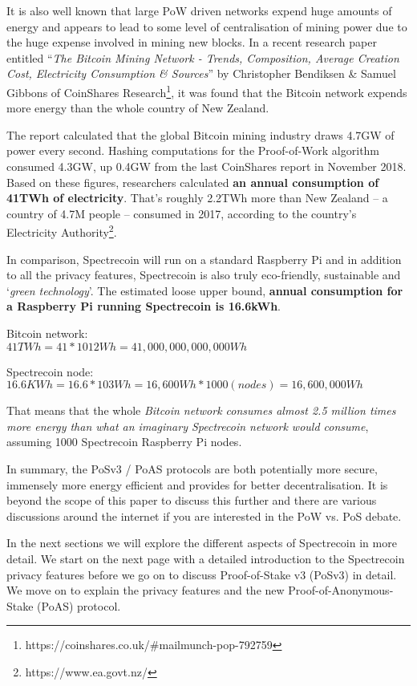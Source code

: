 It is also well known that large PoW driven networks expend huge amounts of
energy and appears to lead to some level of centralisation of mining power
due to the huge expense involved in mining new blocks. In a recent research
paper entitled “\textit{The Bitcoin Mining Network - Trends, Composition, Average
Creation Cost, Electricity Consumption \& Sources}” by Christopher Bendiksen
\& Samuel Gibbons of CoinShares 
Research\footnote{https://coinshares.co.uk/\#mailmunch-pop-792759}, 
it was found that the Bitcoin network expends more energy than the whole 
country of New Zealand.



The report calculated that the global Bitcoin mining industry draws 4.7GW of
power every second. Hashing computations for the Proof-of-Work algorithm
consumed 4.3GW, up 0.4GW from the last CoinShares report in November 2018.
Based on these figures, researchers calculated \textbf{an annual consumption of
41TWh of electricity}. That’s roughly 2.2TWh more than New Zealand – a country
of 4.7M people – consumed in 2017, according to the country’s Electricity
Authority\footnote{https://www.ea.govt.nz/}.



In comparison, Spectrecoin will run on a standard Raspberry Pi and in addition
to all the privacy features, Spectrecoin is also truly eco-friendly, sustainable
and ‘\textit{green technology}’. The estimated loose upper bound, \textbf{annual 
consumption for a Raspberry Pi running Spectrecoin is 16.6kWh}.

\vspace{5mm} %

Bitcoin network:\\
$41 TWh = 41*1012 Wh = 41,000,000,000,000 Wh$

\vspace{5mm} %

Spectrecoin node:\\
$16.6 KWh = 16.6 * 103 Wh = 16,600 Wh * 1000 (nodes) = 16,600,000 Wh$

\vspace{5mm} %

That means that the whole \textit{Bitcoin network consumes almost 2.5 million times
more energy than what an imaginary Spectrecoin network would consume}, assuming
1000 Spectrecoin Raspberry Pi nodes.




In summary, the PoSv3 / PoAS protocols are both potentially more secure,
immensely more energy efficient and provides for better decentralisation.
It is beyond the scope of this paper to discuss this further and there are
various discussions around the internet if you are interested in the PoW vs.
PoS debate.



In the next sections we will explore the different aspects of Spectrecoin in
more detail. We start on the next page with a detailed introduction to the
Spectrecoin privacy features before we go on to discuss Proof-of-Stake v3
(PoSv3) in detail. We move on to explain the privacy features and the new
Proof-of-Anonymous-Stake (PoAS) protocol.